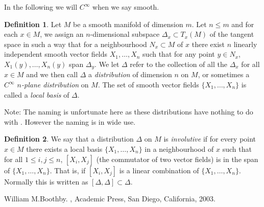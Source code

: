 \documentclass[12pt]{article}
\theoremstyle{theorem}
\theoremstyle{definition}
\newtheorem*{defn}{Definition}
\begin{document}
In the following we will  $C^\infty$ when we say smooth.

\begin{defn}
Let $M$ be a smooth manifold of dimension $m$.  Let $n \leq m$ and for each $x \in M$, we assign an $n$-dimensional subspace
$\Delta_x \subset T_x(M)$ of the tangent space in such a way that for a
neighbourhood $N_x \subset M$ of $x$ there exist $n$ linearly independent
smooth vector fields $X_1,\ldots,X_n$ such that for any point $y \in N_x$,
$X_1(y),\ldots,X_n(y)$ span $\Delta_y$.  We let $\Delta$ refer to the
collection of all the $\Delta_x$ for all $x \in M$ and we then call $\Delta$ a
{\em distribution} of dimension $n$ on $M$, or sometimes a
{\em $C^\infty$ $n$-plane distribution} on $M$.  The set of smooth
vector fields $\{ X_1,\ldots,X_n \}$ is called a {\em local basis} of $\Delta$.
\end{defn}

Note: The naming is unfortunate here as these distributions have nothing
to do with .
However the naming is in wide use.

\begin{defn}
We say that a distribution $\Delta$ on $M$
is {\em involutive} if for every point $x \in M$ there exists a local basis 
$\{ X_1,\ldots,X_n \}$
in a neighbourhood of $x$ such that for all $1 \leq i, j \leq n$, $[X_i,X_j]$
(the commutator of two vector fields) is in the span of 
$\{ X_1,\ldots,X_n \}$.  That is, if 
$[X_i,X_j]$ is a linear combination of $\{ X_1,\ldots,X_n \}$.
Normally this is written as $[ \Delta , \Delta ] \subset \Delta$.
\end{defn}

\begin{thebibliography}{9}
William M.\@ Boothby.
{\em {}},
Academic Press, San Diego, California, 2003.
\end{thebibliography}
\end{document}
